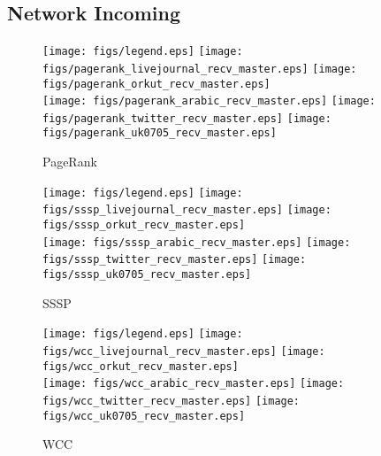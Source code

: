 \documentclass{article}
\newcommand{\bline}[1][1]{\vspace{#1\baselineskip}}
\begin{document}
\pagebreak
\subsection{Network Incoming}
\begin{figure}[!h]
  \bline[1]
  \centering
  \texttt{[image: figs/legend.eps]}\hspace{3em}%
  \texttt{[image: figs/pagerank\_livejournal\_recv\_master.eps]}\hspace{1em}%
  \texttt{[image: figs/pagerank\_orkut\_recv\_master.eps]}\\
  \texttt{[image: figs/pagerank\_arabic\_recv\_master.eps]}\hspace{1em}%
  \texttt{[image: figs/pagerank\_twitter\_recv\_master.eps]}\hspace{1em}%
  \texttt{[image: figs/pagerank\_uk0705\_recv\_master.eps]}
  \caption{PageRank}
\end{figure}

\begin{figure}[!h]
  \bline[3.5]
  \centering
  \texttt{[image: figs/legend.eps]}\hspace{3em}%
  \texttt{[image: figs/sssp\_livejournal\_recv\_master.eps]}\hspace{1em}%
  \texttt{[image: figs/sssp\_orkut\_recv\_master.eps]}\\
  \texttt{[image: figs/sssp\_arabic\_recv\_master.eps]}\hspace{1em}%
  \texttt{[image: figs/sssp\_twitter\_recv\_master.eps]}\hspace{1em}%
  \texttt{[image: figs/sssp\_uk0705\_recv\_master.eps]}
  \caption{SSSP}
\end{figure}

\begin{figure}[!h]
  \bline[3.5]
  \centering
  \texttt{[image: figs/legend.eps]}\hspace{3em}%
  \texttt{[image: figs/wcc\_livejournal\_recv\_master.eps]}\hspace{1em}%
  \texttt{[image: figs/wcc\_orkut\_recv\_master.eps]}\\
  \texttt{[image: figs/wcc\_arabic\_recv\_master.eps]}\hspace{1em}%
  \texttt{[image: figs/wcc\_twitter\_recv\_master.eps]}\hspace{1em}%
  \texttt{[image: figs/wcc\_uk0705\_recv\_master.eps]}
  \caption{WCC}
\end{figure}
\end{document}
